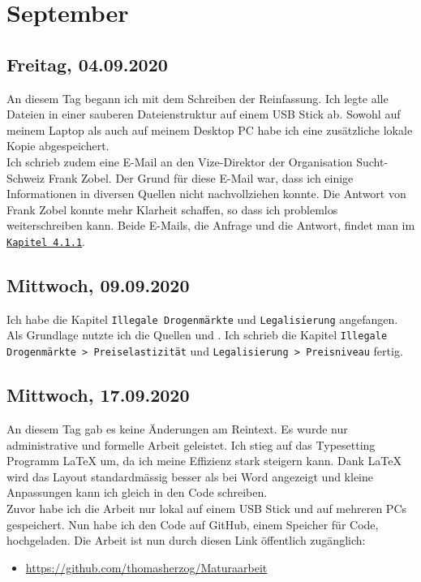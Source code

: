 \documentclass[../main.tex]{subfiles}
\begin{document}
	\section{September}
	
	\subsection{Freitag, 04.09.2020}
	An diesem Tag begann ich mit dem Schreiben der Reinfassung.
	Ich legte alle Dateien in einer sauberen Dateienstruktur auf einem USB Stick ab.
	Sowohl auf meinem Laptop als auch auf meinem Desktop PC habe ich eine zusätzliche lokale Kopie abgespeichert.\\
	\noindent	
	Ich schrieb zudem eine E-Mail an den Vize-Direktor der Organisation Sucht-Schweiz Frank Zobel.
	Der Grund für diese E-Mail war, dass ich einige Informationen in diversen Quellen nicht nachvollziehen konnte.
	Die Antwort von Frank Zobel konnte mehr Klarheit schaffen, so dass ich problemlos weiterschreiben kann.
	Beide E-Mails, die Anfrage und die Antwort, findet man im \hyperlink{Attachment-1.1}{\texttt{Kapitel 4.1.1}}.
	
	
	\subsection{Mittwoch, 09.09.2020}
	Ich habe die Kapitel \texttt{Illegale Drogenmärkte} und \texttt{Legalisierung} angefangen.
	Als Grundlage nutzte ich die Quellen \cite{golzar} und \cite{becker}.
	Ich schrieb die Kapitel \texttt{Illegale Drogenmärkte > Preiselastizität} und \texttt{Legalisierung > Preisniveau} fertig. 
	
	
	\subsection{Mittwoch, 17.09.2020}
	An diesem Tag gab es keine Änderungen am Reintext.
	Es wurde nur administrative und formelle Arbeit geleistet. 
	Ich stieg auf das Typesetting Programm LaTeX um, da ich meine Effizienz stark steigern kann.
	Dank LaTeX wird das Layout standardmässig besser als bei Word angezeigt und kleine Anpassungen kann ich gleich in den Code schreiben.\\
	
	\noindent
	Zuvor habe ich die Arbeit nur lokal auf einem USB Stick und auf mehreren PCs gespeichert.
	Nun habe ich den Code auf GitHub, einem Speicher für Code, hochgeladen.
	Die Arbeit ist nun durch diesen Link öffentlich zugänglich:
	\begin{itemize}
		\item \href{https://github.com/thomasherzog/Maturaarbeit}{https://github.com/thomasherzog/Maturaarbeit}
	\end{itemize}
	
\end{document}
